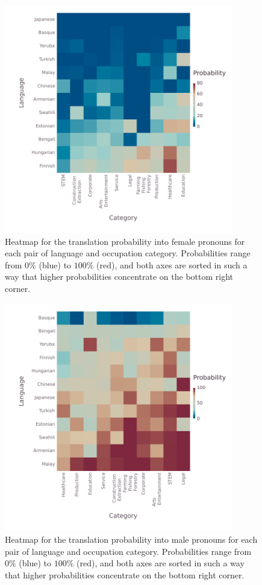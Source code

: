 \documentclass[fleqn,10pt]{article}
\begin{document}
\begin{figure}[H]
	\centering
	\includegraphics[width=10cm]{pictures/heatmap-languages-categories-Female}
	\caption{Heatmap for the translation probability into female pronouns for each pair of language and occupation category. Probabilities range from $0\%$ (blue) to $100\%$ (red), and both axes are sorted in such a way that higher probabilities concentrate on the bottom right corner.}
	\label{fig:heatmap-female}
\end{figure}

\begin{figure}[H]
	\centering
	\includegraphics[width=10cm]{pictures/heatmap-languages-categories-Male}
	\caption{Heatmap for the translation probability into male pronouns for each pair of language and occupation category. Probabilities range from $0\%$ (blue) to $100\%$ (red), and both axes are sorted in such a way that higher probabilities concentrate on the bottom right corner.}
	\label{fig:heatmap-male}
\end{figure}
\end{document}
